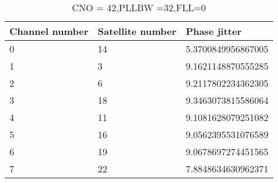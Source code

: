 \begin{table}[!htb]
\centering
\begin{tabular}{|l|l|l|}
\hline
\rowcolor[HTML]{C0C0C0} 
Channel number & Satellite number & Phase jitter       \\ \hline
0              & 14               & 5.3700849956867005 \\ \hline
\rowcolor[HTML]{EFEFEF} 
1              & 3                & 9.1621148870555285 \\ \hline
2              & 6                & 9.2117802234362305 \\ \hline
\rowcolor[HTML]{EFEFEF} 
3              & 18               & 9.3463073815586064 \\ \hline
4              & 11               & 9.1081628079251082 \\ \hline
\rowcolor[HTML]{EFEFEF} 
5              & 16               & 9.0562395531076589 \\ \hline
6              & 19               & 9.0678697274451565 \\ \hline
\rowcolor[HTML]{EFEFEF} 
7              & 22               & 7.8848634630962371 \\ \hline
\end{tabular}
\caption{CNO = 42,PLLBW =32,FLL=0}
\label{my-label}
\end{table}